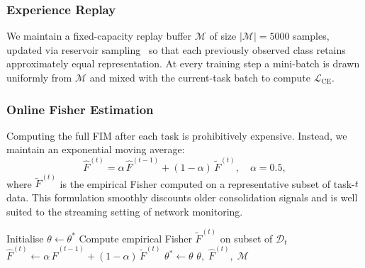 \subsubsection{Experience Replay}
We maintain a fixed-capacity replay buffer
$\mathcal{M}$ of size $|\mathcal{M}|=5000$ samples, updated via
reservoir sampling~\cite{vitter1985random} so that each previously
observed class retains approximately equal representation.  At every
training step a mini-batch is drawn uniformly from $\mathcal{M}$ and
mixed with the current-task batch to compute
$\mathcal{L}_{\mathrm{CE}}$.

\subsubsection{Online Fisher Estimation}
Computing the full FIM after each task is prohibitively expensive.
Instead, we maintain an exponential moving average:
\begin{equation}
  \hat{F}^{(t)}
  = \alpha\,\hat{F}^{(t-1)} + (1-\alpha)\,\tilde{F}^{(t)},
  \quad \alpha=0.5,
  \label{eq:fisher_ema}
\end{equation}
where $\tilde{F}^{(t)}$ is the empirical Fisher computed on a
representative subset of task-$t$ data.  This formulation smoothly
discounts older consolidation signals and is well suited to the
streaming setting of network monitoring.

\begin{algorithm}[t]
\DontPrintSemicolon
\SetAlgoLined
{}
Initialise $\theta \leftarrow \theta^{*}$\;
Compute empirical Fisher $\tilde{F}^{(t)}$ on subset of
$\mathcal{D}_t$\;
$\hat{F}^{(t)}\leftarrow\alpha\,\hat{F}^{(t-1)}
  +(1-\alpha)\,\tilde{F}^{(t)}$\;
$\theta^{*}\leftarrow\theta$\;
\Return $\theta,\;\hat{F}^{(t)},\;\mathcal{M}$\;
\caption{EWC with Experience Replay and Online Fisher Estimation}
\label{alg:ewc}
\end{algorithm}

